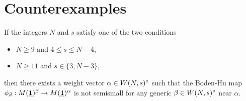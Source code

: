 \documentclass{article}
\begin{document}
\section{Counterexamples} \label{negative}

\begin{prop} \label{examples}
  If the integers $N$ and $s$ satisfy one of the two conditions
  \begin{itemize}
   \item[i)] $N \geq 9$ and $4 \leq s \leq N-4$,
   \item[ii)] $N \geq 11$ and $s \in \{3, N-3\}$,
  \end{itemize}
  then there exists a weight vector $\alpha \in W(N, s)^{\circ}$ such that the Boden-Hu map
  $\phi_{\beta}: M(\underline{\mathbf{1}})^{\beta} \to M(\underline{\mathbf{1}})^{\alpha}$ is not semismall for any generic $\beta \in W(N, s)^{\circ}$ near $\alpha$.
\end{prop}
\end{document}
